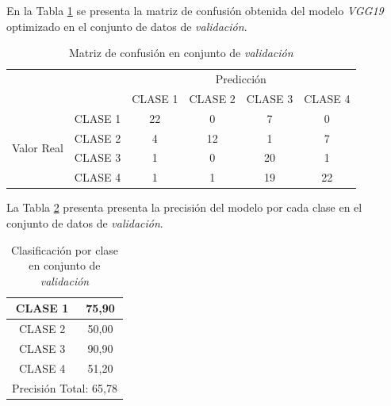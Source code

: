 \vspace{0.5cm}

En la Tabla \ref{tab:MC_VGG19_OPT} se presenta la matriz de confusión obtenida del modelo \textit{VGG19} optimizado en el conjunto de datos de \textit{validación}.

\vspace{0.5cm}

\begin{table}[htbp]
	\centering
	\begin{tabular}{|c|l|c|c|c|c|}
		\hline
		\multicolumn{2}{|c|}{\multirow{2}[4]{*}{}} & \multicolumn{4}{c|}{Predicción} \bigstrut\\
		\cline{3-6}    \multicolumn{2}{|c|}{} & CLASE 1 & CLASE 2 & CLASE 3 & CLASE 4 \bigstrut\\
		\hline
		\multirow{4}[8]{*}{\begin{sideways}Valor Real\end{sideways}} & CLASE 1 & 22    & 0     & 7    & 0 \bigstrut\\
		\cline{2-6}          & CLASE 2 & 4     & 12     & 1    & 7 \bigstrut\\
		\cline{2-6}          & CLASE 3 & 1     & 0     & 20    & 1 \bigstrut\\
		\cline{2-6}          & CLASE 4 & 1     & 1     & 19    & 22 \bigstrut\\
		\hline
	\end{tabular}%
	\caption{Matriz de confusión en conjunto de \textit{validación}}
	\label{tab:MC_VGG19_OPT}%
\end{table}%


\newpage
La Tabla \ref{tab:VGG19optclases} presenta presenta la precisión del modelo por cada clase en el conjunto de datos de \textit{validación}.

\begin{table}[htbp]
	\centering
	\begin{tabular}{|c|c|}
		\hline
		CLASE 1 & 75,90 \bigstrut\\
		\hline
		CLASE 2 & 50,00 \bigstrut\\
		\hline
		CLASE 3 & 90,90 \bigstrut\\
		\hline
		CLASE 4 & 51,20 \bigstrut\\
		\hline
		\multicolumn{2}{|c|}{Precisión Total: 65,78} \bigstrut\\
		\hline
	\end{tabular}%
	\caption{Clasificación por clase en conjunto de \textit{validación}}
	\label{tab:VGG19optclases}%
\end{table}

